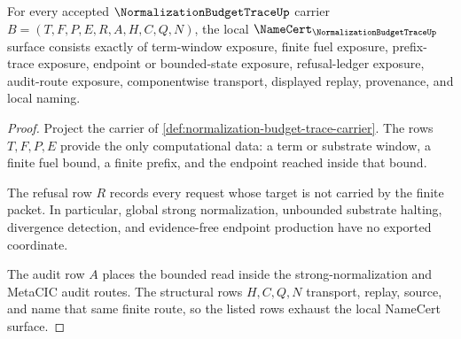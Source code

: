\begin{theorem}
\label{thm:normalization-budget-trace-namecert-obligations}
For every accepted $\NormalizationBudgetTraceUp$ carrier $B=(T,F,P,E,R,A,H,C,Q,N)$, the local $\NameCert_{\NormalizationBudgetTraceUp}$ surface consists exactly of term-window exposure, finite fuel exposure, prefix-trace exposure, endpoint or bounded-state exposure, refusal-ledger exposure, audit-route exposure, componentwise transport, displayed replay, provenance, and local naming.
\end{theorem}
\begin{proof}
Project the carrier of \autoref{def:normalization-budget-trace-carrier}. The rows $T,F,P,E$ provide the only computational data: a term or substrate window, a finite fuel bound, a finite prefix, and the endpoint reached inside that bound.

The refusal row $R$ records every request whose target is not carried by the finite packet. In particular, global strong normalization, unbounded substrate halting, divergence detection, and evidence-free endpoint production have no exported coordinate.

The audit row $A$ places the bounded read inside the strong-normalization and MetaCIC audit routes. The structural rows $H,C,Q,N$ transport, replay, source, and name that same finite route, so the listed rows exhaust the local NameCert surface.
\end{proof}

